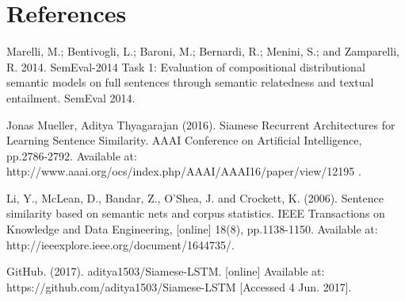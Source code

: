 \section{References}
%
%

\justify

Marelli, M.; Bentivogli, L.; Baroni, M.; Bernardi, R.; Menini, S.; and Zamparelli, R. 2014. SemEval-2014 Task 1: Evaluation of compositional distributional semantic models on full sentences through semantic relatedness and textual entailment. SemEval 2014.

Jonas Mueller, Aditya Thyagarajan (2016). Siamese Recurrent Architectures for Learning Sentence Similarity. AAAI Conference on Artificial Intelligence, pp.2786-2792. Available at: http://www.aaai.org/ocs/index.php/AAAI/AAAI16/paper/view/12195 .

Li, Y., McLean, D., Bandar, Z., O'Shea, J. and Crockett, K. (2006). Sentence similarity based on semantic nets and corpus statistics. IEEE Transactions on Knowledge and Data Engineering, [online] 18(8), pp.1138-1150. Available at: http://ieeexplore.ieee.org/document/1644735/.

GitHub. (2017). aditya1503/Siamese-LSTM. [online] Available at: https://github.com/aditya1503/Siamese-LSTM [Accessed 4 Jun. 2017].
